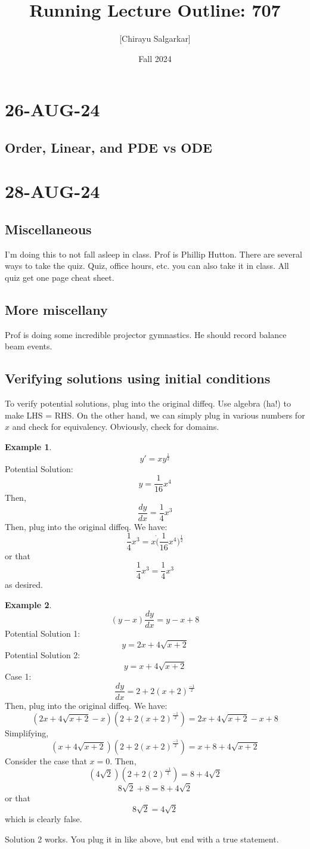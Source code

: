 \documentclass[10pt, oneside]{article}
\title{Running Lecture Outline: 707}
\author{[Chirayu Salgarkar]}
\date{Fall 2024}
\theoremstyle{definition}
\newtheorem{example}{Example}[section]
\begin{document}
\maketitle
\tableofcontents

\vspace{.25in}
\section{26-AUG-24}
\subsection{Order, Linear, and PDE vs ODE}
\section{28-AUG-24}

\subsection{Miscellaneous}
I'm doing this to not fall asleep in class. Prof is Phillip Hutton. There are several ways to take the quiz. Quiz, office hours, etc. you can also take it in class. All quiz get one page cheat sheet. 

\subsection{More miscellany}
Prof is doing some incredible projector gymnastics. He should record balance beam events.
\subsection{Verifying solutions using initial conditions}
To verify potential solutions, plug into the original diffeq. Use algebra (ha!) to make LHS = RHS. On the other hand, we can simply plug in various numbers for $x$ and check for equivalency. Obviously, check for domains. 
\begin{example}
   \[ y' = xy^{\frac{1}{2}}\]
Potential Solution: \[y = \frac{1}{16}x^4\]
Then, 
    \[\frac{dy}{dx} = \frac{1}{4}x^3 \]
Then, plug into the original diffeq. We have:
    \[ \frac{1}{4}x^3 = x \dot (\frac{1}{16}x^4)^{\frac{1}{2}}\]
or that
    \[\frac{1}{4}x^3 = \frac{1}{4}x^3 \]
as desired. 
\end{example}

\begin{example}
    \[ (y-x)\frac{dy}{dx} = y-x+8\]
     Potential Solution 1: \[y = 2x + 4\sqrt{x+2}\]
    Potential Solution 2: \[y = x + 4\sqrt{x+2}\]
    Case 1:
     \[\frac{dy}{dx} = 2 + 2(x+2)^{\frac{-1}{2}} \]
     Then, plug into the original diffeq. We have:
     \[ (2x + 4\sqrt{x+2} - x)(2 + 2(x+2)^{\frac{-1}{2}}) = 2x + 4\sqrt{x+2} -x+8\]
     Simplifying,
    \[ (x + 4\sqrt{x+2})(2 + 2(x+2)^{\frac{-1}{2}}) = x+8 + 4\sqrt{x+2}\]
    Consider the case that $x=0$. Then,
    \[ (4\sqrt{2})(2 + 2(2)^{\frac{-1}{2}}) = 8 + 4\sqrt{2}\]
    \[8\sqrt{2} + 8 = 8 + 4\sqrt{2} \] 
    or that 
    \[8\sqrt{2} = 4\sqrt{2}\]
 which is clearly false. 

 Solution 2 works. You plug it in like above, but end with a true statement. 
 \end{example}
\end{document}
